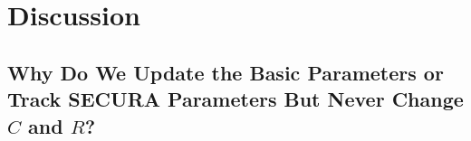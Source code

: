 

\section{Discussion}

\subsection{Why Do We Update the Basic Parameters or Track SECURA Parameters But Never Change \(C\) and \(R\)?}

